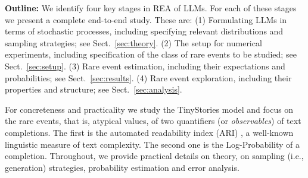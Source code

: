 \documentclass{article}
\begin{document}
\textbf{Outline:} We identify four key stages in REA of LLMs. For each of these stages we present a complete end-to-end study. These are:
(1) Formulating LLMs in terms of stochastic processes, including specifying relevant distributions and sampling strategies; see Sect.~\ref{sec:theory}.
(2) The setup for numerical experiments, including specification of the class of rare events to be studied; see Sect.~\ref{sec:setup}.
(3) Rare event estimation, including their expectations and probabilities; see Sect.~\ref{sec:results}.
(4) Rare event exploration, including their properties and structure; see Sect.~\ref{sec:analysis}.



For concreteness and practicality we study the TinyStories model \cite{eldan2023tinystories:} and focus on the rare events, that is, atypical values, of two quantifiers (or \textit{observables}) of text completions. The first is the automated readability index (ARI) \cite{kincaid1975derivation}, a well-known linguistic measure of text complexity. The second one is the Log-Probability of a completion. Throughout, we provide practical details on theory, on sampling (i.e., generation) strategies, probability estimation and error analysis.
\end{document}
